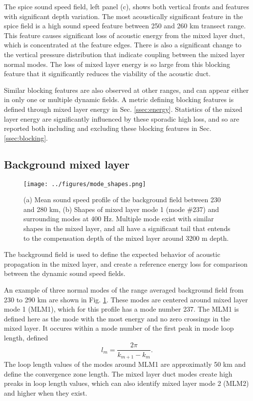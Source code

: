 \documentclass[preprint,NumberedRefs]{JASA}
\begin{document}
The spice sound speed field, left panel (c), shows both vertical fronts and features with significant depth variation. The most acoustically significant feature in the spice field is a high sound speed feature between 250 and 260 km transect range. This feature causes significant loss of acoustic energy from the mixed layer duct, which is concentrated at the feature edges. There is also a significant change to the vertical pressure distribution that indicate coupling between the mixed layer normal modes. The loss of mixed layer energy is so large from this blocking feature that it significantly reduces the viability of the acoustic duct.

Similar blocking features are also observed at other ranges, and can appear either in only one or multiple dynamic fields. A metric defining blocking features is defined through mixed layer energy in Sec. \ref{ssec:energy}. Statistics of the mixed layer energy are significantly influenced by these sporadic high loss, and so are reported both including and excluding these blocking features in Sec. \ref{ssec:blocking}.

\subsection{Background mixed layer}\label{ssec:modes}
\begin{figure}
\texttt{[image: ../figures/mode\_shapes.png]}
    \caption{\label{fig:bg_modes}{(a) Mean sound speed profile of the background field between 230 and 280 km, (b) Shapes of mixed layer mode 1 (mode \#237) and surrounding modes at 400 Hz. Multiple mode exist with similar shapes in the mixed layer, and all have a significant tail that entends to the compensation depth of the mixed layer around 3200 m depth.}}
\end{figure}
The background field is used to define the expected behavior of acoustic propagation in the mixed layer, and create a reference energy loss for comparison between the dynamic sound speed fields.

An example of three normal modes of the range averaged background field from 230 to 290 km are shown in Fig. \ref{fig:bg_modes}. These modes are centered around mixed layer mode 1 (MLM1), which for this profile has a mode number 237. The MLM1 is defined here as the mode with the most energy and no zero crossings in the mixed layer. It occures within a mode number of the first peak in mode loop length\citep{jensen2011computational}, defined
\begin{equation}
    l_{m} = \frac{2 \pi}{k_{m+1} - k_m}.
    \label{eq:loop_length}
\end{equation}
The loop length values of the modes around MLM1 are approximatly 50 km and define the convergence zone length. The mixed layer duct modes create high preaks in loop length values, which can also identify mixed layer mode 2 (MLM2) and higher when they exist.
\end{document}
